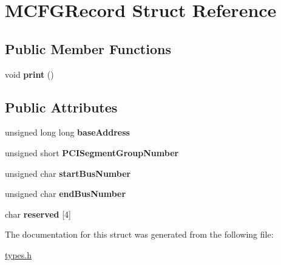 \hypertarget{struct_m_c_f_g_record}{}\section{M\+C\+F\+G\+Record Struct Reference}
\label{struct_m_c_f_g_record}
\subsection*{Public Member Functions}
\begin{DoxyCompactItemize}
\item 
\mbox{\label{struct_m_c_f_g_record_a4b954297f9dd2db580af3305dc2c1200}} 
void {\bfseries print} ()
\end{DoxyCompactItemize}
\subsection*{Public Attributes}
\begin{DoxyCompactItemize}
\item 
\mbox{\label{struct_m_c_f_g_record_ab80de5ed728d89f1bd60647e0e909289}} 
unsigned long long {\bfseries base\+Address}
\item 
\mbox{\label{struct_m_c_f_g_record_a2ead77d33416e9f9a8607c7bdc9a3aa4}} 
unsigned short {\bfseries P\+C\+I\+Segment\+Group\+Number}
\item 
\mbox{\label{struct_m_c_f_g_record_a88a45ddf628776154cb5ed02b384061d}} 
unsigned char {\bfseries start\+Bus\+Number}
\item 
\mbox{\label{struct_m_c_f_g_record_a39692440cf50265f71b638d433a7ce37}} 
unsigned char {\bfseries end\+Bus\+Number}
\item 
\mbox{\label{struct_m_c_f_g_record_a549591813ff09495f6ee59cb3288f130}} 
char {\bfseries reserved} \mbox{[}4\mbox{]}
\end{DoxyCompactItemize}


The documentation for this struct was generated from the following file\+:\begin{DoxyCompactItemize}
\item 
\mbox{\hyperlink{types_8h}{types.\+h}}\end{DoxyCompactItemize}
